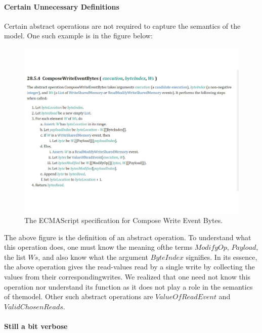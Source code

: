 \paragraph{Certain Unnecessary Definitions}
    
    Certain abstract operations are not required to capture the semantics of the model. 
    One such example is in the figure below:
    \begin{figure}[H]
        \centering 
        \includegraphics[scale=0.6]{4.ECMAScriptMemoryModel/ECMAScriptStd.pdf}
        \caption{The ECMAScript specification for Compose Write Event Bytes.}
    \end{figure}
    The above figure is the definition of an abstract operation. To understand what this operation does, one must know the meaning ofthe terms $ModifyOp$, $Payload$, the list $Ws$, and also know what the argument $ByteIndex$ signifies. 
    In its essence, the above operation gives the read-values read by a single write by collecting the values from their correspondingwrites. 
    We realized that one need not know this operation nor understand its function as it does not play a role in the semantics of themodel. 
    Other such abstract operations are $ValueOfReadEvent$ and $ValidChosenReads$. 

\paragraph{Still a bit verbose}
    
